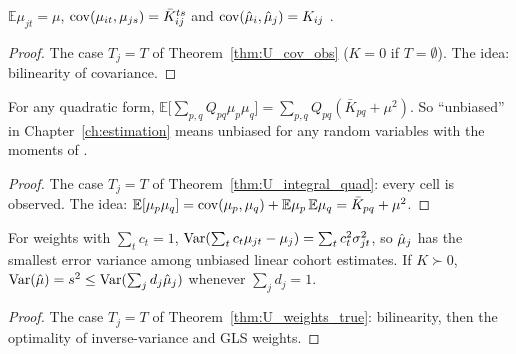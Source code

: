 \begin{theorem}\label{thm:cov_obs}
  \leanok
  $\mathbb E\mu_{jt} = \mu$, $\operatorname{cov}(\mu_{it},\mu_{js}) = \bar K_{ij}^{ts}$
   and $\operatorname{cov}(\hat\mu_i,\hat\mu_j) = K_{ij}$ .
\end{theorem}
\begin{proof}
  \leanok
  The case $T_j = T$ of Theorem~\ref{thm:U_cov_obs} ($K = 0$ if
  $T = \emptyset$). The idea: bilinearity of covariance.
\end{proof}

\begin{theorem}\label{thm:integral_quad}
  \leanok
  For any quadratic form,
  $\mathbb E\bigl[\sum_{p,q} Q_{pq}\mu_p\mu_q\bigr] = \sum_{p,q} Q_{pq}(\bar K_{pq} + \mu^2)$.
  So ``unbiased'' in Chapter~\ref{ch:estimation} means unbiased for any random
  variables with the moments of .
\end{theorem}
\begin{proof}
  \leanok
  The case $T_j = T$ of Theorem~\ref{thm:U_integral_quad}: every cell is
  observed. The idea: $\mathbb E[\mu_p\mu_q] = \operatorname{cov}(\mu_p,\mu_q) + \mathbb E\mu_p\,\mathbb E\mu_q
  = \bar K_{pq} + \mu^2$.
\end{proof}

\begin{theorem}\label{thm:weights_true}
  \leanok
  For weights with $\sum_t c_t = 1$,
  $\operatorname{Var}(\sum_t c_t\mu_{jt} - \mu_j) = \sum_t c_t^2\sigma_{jt}^2$, so $\hat\mu_j$
  has the smallest error variance among unbiased linear cohort estimates.
  If $K \succ 0$, $\operatorname{Var}(\hat\mu) = s^2 \le \operatorname{Var}(\sum_j d_j\hat\mu_j)$ whenever
  $\sum_j d_j = 1$.
\end{theorem}
\begin{proof}
  \leanok
  The case $T_j = T$ of Theorem~\ref{thm:U_weights_true}: bilinearity, then
  the optimality of inverse-variance and GLS weights.
\end{proof}


